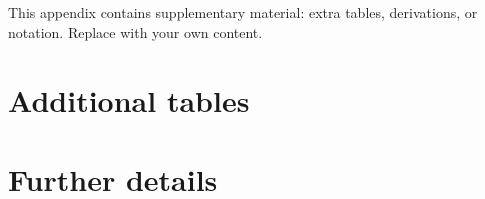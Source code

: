 %

This appendix contains supplementary material: extra tables, derivations, or notation. Replace with your own content.

\section{Additional tables}\label{app:tables}

\lipsum[61-62]

\section{Further details}\label{app:details}

\lipsum[63-65]
